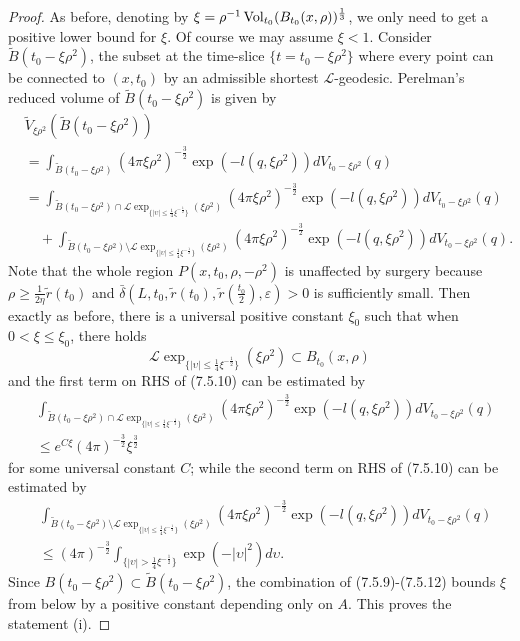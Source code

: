 \begin{proof}
As before, denoting by
$\xi=\rho^{-1}\operatorname{Vol}_{t_0}(B_{t_0}(x,\rho))^{\frac{1}{3}}$, we only
need to get a positive lower bound for $\xi$. Of course we may
assume $\xi<1$. Consider $\widetilde{B}(t_0-\xi\rho^2)$, the
subset at the time-slice $\{t=t_0-\xi\rho^2\}$ where every point
can be connected to $(x,t_0)$ by an admissible shortest
$\mathcal{L}$-geodesic. Perelman's reduced volume of
$\widetilde{B}(t_0-\xi\rho^2)$ is given by
\begin{align}
& \widetilde{V}_{\xi\rho^2}(\widetilde{B}(t_0-\xi\rho^2))\\
&  = \int_{\widetilde{B}(t_0-\xi\rho^2)}
(4\pi\xi\rho^2)^{-\frac{3}{2}}
\exp(-l(q,\xi\rho^2))dV_{t_0-\xi\rho^2}(q) \nonumber\\
& =\int_{\widetilde{B}(t_0-\xi\rho^2)\cap\mathcal{L}
\exp_{\{|\upsilon|\leq\frac{1}{4}
\xi^{-\frac{1}{2}}\}}(\xi\rho^2)} (4\pi\xi\rho^2)^{-\frac{3}{2}}
\exp(-l(q,\xi\rho^2))dV_{t_0-\xi\rho^2}(q) \nonumber\\
&\quad  +\int_{\widetilde{B}(t_0-\xi\rho^2)
\setminus\mathcal{L}\exp_{\{|\upsilon|\leq\frac{1}{4}
\xi^{-\frac{1}{2}}\}}(\xi\rho^2)} (4\pi\xi\rho^2)^{-\frac{3}{2}}
\exp(-l(q,\xi\rho^2))dV_{t_0-\xi\rho^2}(q). \nonumber
\end{align}  %
Note that the whole region $P(x,t_0,\rho,-\rho^2)$ is unaffected
by surgery because $\rho\geq \frac{1}{2\eta}\widetilde{r}(t_0)$
and $\bar{\delta}(L,t_0,\widetilde{r}(t_0),
\widetilde{r}(\frac{t_0}{2}),\varepsilon)>0$ is sufficiently
small. Then exactly as before, there is a universal positive
constant $\xi_0$ such that when $0<\xi\leq\xi_0$, there holds
$$
\mathcal{L}\exp_{\{|\upsilon|\leq\frac{1}{4}
\xi^{-\frac{1}{2}}\}}(\xi\rho^2)\subset B_{t_0}(x,\rho)
$$
and the first term on RHS of (7.5.10) can be estimated by
\begin{align}
&\int_{\widetilde{B}(t_0-\xi\rho^2)\cap\mathcal{L}
\exp_{\{|\upsilon|\leq\frac{1}{4}\xi^{-\frac{1}{2}}\}}
(\xi\rho^2)}(4\pi\xi\rho^2)^{-\frac{3}{2}}
\exp(-l(q,\xi\rho^2))dV_{t_0-\xi\rho^2}(q)\\
&\leq e^{C\xi}(4\pi)^{-\frac{3}{2}}\xi^{\frac{3}{2}}\nonumber  %
\end{align}
for some universal constant $C$; while the second term on RHS of
(7.5.10) can be estimated by
\begin{align}
&\int_{\widetilde{B}(t_0-\xi\rho^2)\setminus\mathcal{L}
\exp_{\{|\upsilon|\leq\frac{1}{4}\xi^{-\frac{1}{2}}\}}
(\xi\rho^2)}(4\pi\xi\rho^2)^{-\frac{3}{2}}
\exp(-l(q,\xi\rho^2))dV_{t_0-\xi\rho^2}(q)\\
&\leq(4\pi)^{-\frac{3}{2}}\int_{\{|\upsilon|>\frac{1}{4}
\xi^{-\frac{1}{2}}\}}\exp(-|\upsilon|^2)d\upsilon. \nonumber
\end{align}
Since $B(t_0-\xi\rho^2)\subset\widetilde{B}(t_0-\xi\rho^2)$, the
combination of (7.5.9)-(7.5.12) bounds $\xi$ from below by a
positive constant depending only on $A$. This proves the statement
(i).


\end{proof}

